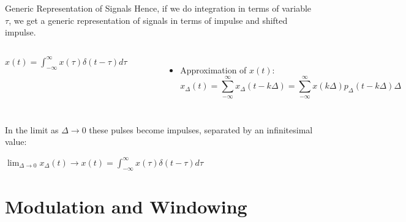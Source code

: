 \documentclass[aspectratio=169,xcolor=dvipsnames,svgnames,x11names,fleqn]{beamer}
\begin{document}
\begin{frame}{Generic Representation of Signals}
Hence, if we do integration in terms of variable $\tau$, we get a generic representation of signals in terms of impulse and shifted impulse.
\begin{columns}
   $x(t) = \int_{-\infty}^\infty x(\tau ) \delta(t-\tau)d\tau $

     \includegraphics[width=0.85\linewidth,trim=0 0 0 0cm,clip]{figures/signal_multiplication.png}

      \includegraphics[width=0.85\linewidth,trim=0 0 0 0cm,clip]{figures/signal_sums.png}
      \begin{itemize}
          \item Approximation of $x(t)$:
          \footnotesize
          {
          \begin{equation*}
              x_\Delta(t) = \sum_{-\infty}^\infty x_\Delta(t-k\Delta) = \sum_{-\infty}^\infty x(k\Delta) p_\Delta(t-k\Delta)\Delta
          \end{equation*}
          }
      \end{itemize}
\end{columns}
In the limit as $\Delta \to 0$ these pulses become impulses, separated by an infinitesimal value:

$\lim_{\Delta \to 0 }x_\Delta(t) \to x(t)  =  \int_{-\infty}^\infty x(\tau ) \delta(t-\tau)d\tau $
    
\end{frame}

\section{Modulation and Windowing}
\end{document}
